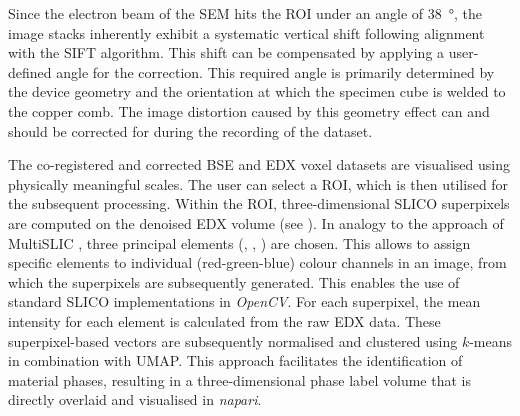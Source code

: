 Since the electron beam of the \ac{SEM} hits the \ac{ROI} under an angle of \qty{38}{\degree}, the image stacks inherently exhibit a systematic vertical shift following alignment with the \ac{SIFT} algorithm.
This shift can be compensated by applying a user-defined angle for the correction.
This required angle is primarily determined by the device geometry and the orientation at which the specimen cube is welded to the copper comb.
The image distortion caused by this geometry effect can and should be corrected for during the recording of the dataset.

The co-registered and corrected \ac{BSE} and \ac{EDX} voxel datasets are visualised using physically meaningful scales.
The user can select a ROI, which is then utilised for the subsequent processing.
Within the \ac{ROI}, three-dimensional \ac{SLIC}O superpixels are computed on the denoised \ac{EDX} volume (see ).
In analogy to the approach of Multi\ac{SLIC} \cite{yu.2023}, three principal elements (, , ) are chosen.
This allows to assign specific elements to individual (red-green-blue) colour channels in an image, from which the superpixels are subsequently generated.
This enables the use of standard \ac{SLIC}O implementations in \textit{OpenCV}.
For each superpixel, the mean intensity for each element is calculated from the raw \ac{EDX} data.
These superpixel-based vectors are subsequently normalised and clustered using $k$-means in combination with \ac{UMAP}.
This approach facilitates the identification of material phases, resulting in a three-dimensional phase label volume that is directly overlaid and visualised in \textit{napari}.


